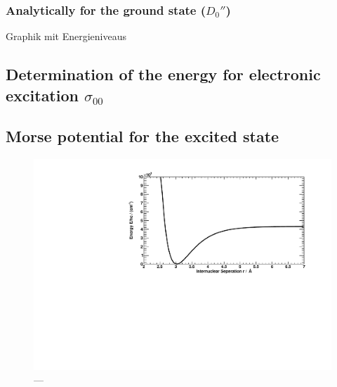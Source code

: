 \subsubsection{Analytically for the ground state ($D_0''$)}

Graphik mit Energieniveaus

\subsection{Determination of the energy for electronic excitation \texorpdfstring{$\sigma_{00}$}{s00}}

\subsection{Morse potential for the excited state}


\begin{figure}[H]
\begin{center}
  \includegraphics[width=\textwidth]{../img/morse.pdf}
  \caption[---]{---}
  \label{img:morse}
\end{center}
\end{figure}

